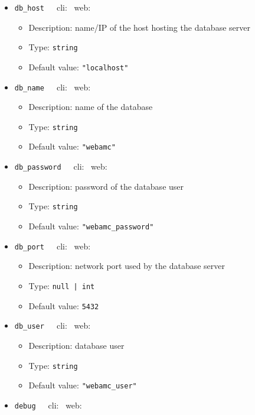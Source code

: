 {\begin{itemize}[itemsep=0pt,parsep=0pt,topsep=0pt,partopsep=0pt]
\begin{itemize}[itemsep=0pt,parsep=0pt,topsep=0pt,partopsep=0pt]
  \end{itemize}
\item{\tt{db\_host}}~~~cli: \cmark~web: \cmark
  \begin{itemize}[itemsep=0pt,parsep=0pt,topsep=0pt,partopsep=0pt]
  \item Description:  name/IP of the host hosting the database server
  \item Type:  {\tt{string}}
  \item Default value:  {\tt{"localhost"}}
  \end{itemize}
\item{\tt{db\_name}}~~~cli: \cmark~web: \cmark
  \begin{itemize}[itemsep=0pt,parsep=0pt,topsep=0pt,partopsep=0pt]
  \item Description:  name of the database
  \item Type:  {\tt{string}}
  \item Default value:  {\tt{"webamc"}}
  \end{itemize}
\item{\tt{db\_password}}~~~cli: \cmark~web: \cmark
  \begin{itemize}[itemsep=0pt,parsep=0pt,topsep=0pt,partopsep=0pt]
  \item Description:  password of the database user
  \item Type:  {\tt{string}}
  \item Default value:  {\tt{"webamc\_password"}}
  \end{itemize}
\item{\tt{db\_port}}~~~cli: \cmark~web: \cmark
  \begin{itemize}[itemsep=0pt,parsep=0pt,topsep=0pt,partopsep=0pt]
  \item Description:  network port used by the database server
  \item Type:  {\tt{null | int}}
  \item Default value:  {\tt{5432}}
  \end{itemize}
\item{\tt{db\_user}}~~~cli: \xmark~web: \cmark
  \begin{itemize}[itemsep=0pt,parsep=0pt,topsep=0pt,partopsep=0pt]
  \item Description:  database user
  \item Type:  {\tt{string}}
  \item Default value:  {\tt{"webamc\_user"}}
  \end{itemize}
\item{\tt{debug}}~~~cli: \xmark~web: \cmark

\end{itemize}}
